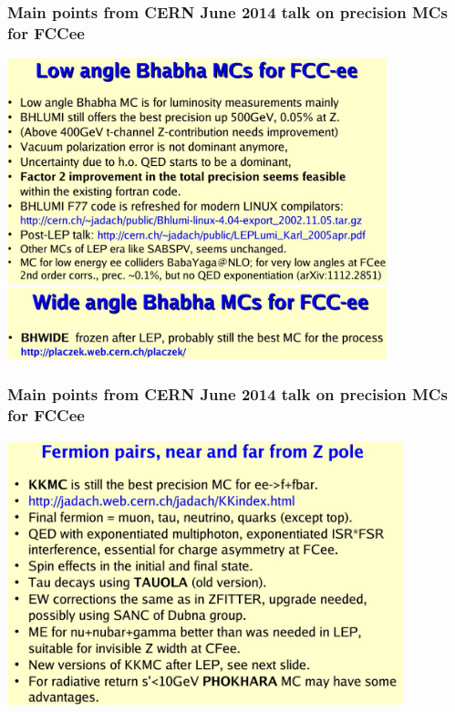 \documentclass{beamer}
\newcommand{\ns}{\normalsize}
\begin{document}
\begin{frame}[fragile]
\frametitle{\bf\ns 
 Main points from CERN June 2014 talk on precision MCs for FCCee}

\vspace{-2mm}
\includegraphics[width=110mm]{./sli4.jpg}
\includegraphics[width=110mm]{./sli5.jpg}
\end{frame}

\begin{frame}[fragile]
\frametitle{\bf\ns 
 Main points from CERN June 2014 talk on precision MCs for FCCee}

\includegraphics[width=115mm]{./sli6.jpg}
\end{frame}
\end{document}

